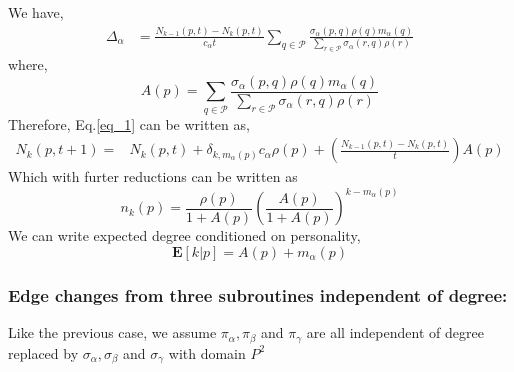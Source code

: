 \documentclass[runningheads]{llncs}
\begin{document}
We have,
\begin{equation}\label{eq_2}
\begin{aligned}
\Delta_{\alpha} &=\frac{N_{k-1}(p, t)-N_{k}(p, t)}{c_{\alpha} t} \sum_{q \in \mathcal{P}} \frac{\sigma_{\alpha}(p, q) \rho(q) m_{\alpha}(q)}{\sum_{r \in \mathcal{P}} \sigma_{\alpha}(r, q) \rho(r)}
\end{aligned}\end{equation}
where,
\begin{equation}\label{eq_3}
A(p)=\sum_{q \in \mathcal{P}} \frac{\sigma_{\alpha}(p, q) \rho(q) m_{\alpha}(q)}{\sum_{r \in \mathcal{P}} \sigma_{\alpha}(r, q) \rho(r)}\end{equation}
Therefore, Eq.\ref{eq_1} can be written as,
$$\begin{aligned}
N_{k}(p, t+1)=& N_{k}(p, t)+\delta_{k, m_{\alpha}(p)} c_{\alpha} \rho(p) +\left(\frac{N_{k-1}(p,t)-N_{k}(p, t)}{t}\right) A(p)
\end{aligned}$$
Which with furter reductions can be written as
\begin{equation}\label{eq_4}
n_{k}(p)=\frac{\rho(p)}{1+A(p)}\left(\frac{A(p)}{1+A(p)}\right)^{k-m_{\alpha}(p)}\end{equation}
We can write expected degree conditioned on personality, 
\begin{equation}\label{eq_5}
\mathbf{E}[k | p]=A(p)+m_{\alpha}(p)\end{equation}

\subsubsection{Edge changes from three subroutines independent of degree:}

Like the previous case, we assume $\pi_{\alpha}, \pi_{\beta}$ and $\pi_{\gamma}$ are all independent of degree replaced by $\sigma_{\alpha}, \sigma_{\beta}$ and $\sigma_{\gamma}$ with domain $P^{2}$
\end{document}
